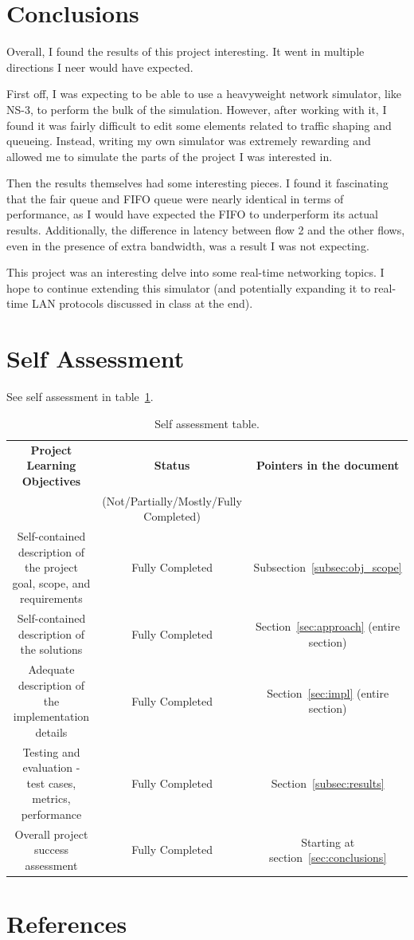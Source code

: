 \documentclass[conference]{IEEEtran}
\begin{document}
    \section{Conclusions}
Overall, I found the results of this project interesting.
It went in multiple directions I neer would have expected.

First off, I was expecting to be able to use a heavyweight network simulator, like NS-3, to perform the bulk of the
simulation.
However, after working with it, I found it was fairly difficult to edit some elements related to traffic shaping and queueing.
Instead, writing my own simulator was extremely rewarding and allowed me to simulate the parts of the project I was
interested in.

Then the results themselves had some interesting pieces. \label{sec:conclusions}
I found it fascinating that the fair queue and FIFO queue were nearly identical in terms of performance, as I would have
expected the FIFO to underperform its actual results.
Additionally, the difference in latency between flow 2 and the other flows, even in the presence of extra bandwidth,
was a result I was not expecting.

This project was an interesting delve into some real-time networking topics.
I hope to continue extending this simulator (and potentially expanding it to real-time LAN protocols discussed in class
at the end).

    \section{Self Assessment}
    See self assessment in table~\ref{tab:self-assmt}.

    \begin{table}[b]
        \centering
        \caption{Self assessment table.}
        \label{tab:self-assmt}
        \begin{tabular}{|c|c|c|}
            \hline
            \textbf{Project Learning Objectives} & \textbf{Status} & \textbf{Pointers in the document} \\
             & (Not/Partially/Mostly/Fully Completed) &  \\
            \hline
            Self-contained description of the project goal, scope, and requirements & Fully Completed & Subsection~\ref{subsec:obj_scope} \\
            \hline
            Self-contained description of the solutions & Fully Completed & Section~\ref{sec:approach} (entire section)\\
            \hline
            Adequate description of the implementation details & Fully Completed & Section~\ref{sec:impl} (entire section)\\
            \hline
            Testing and evaluation - test cases, metrics, performance & Fully Completed & Section~\ref{subsec:results}\\
            \hline
            Overall project success assessment & Fully Completed & Starting at section~\ref{sec:conclusions}\\
            \hline
        \end{tabular}

    \end{table}

    \section{References}
    
    
\end{document}

